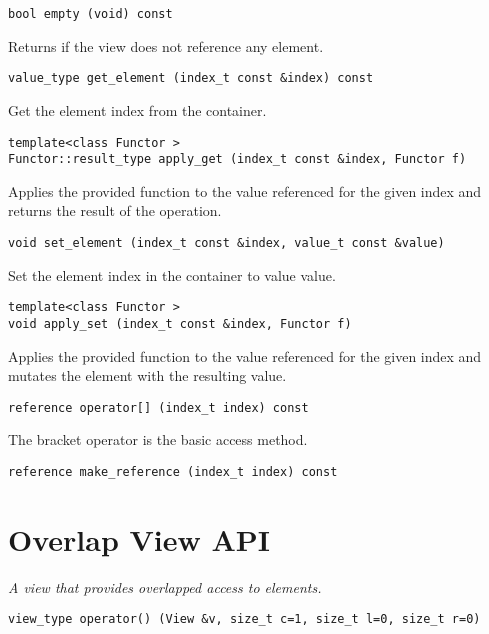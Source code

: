 \begin{verbatim}
bool empty (void) const
\end{verbatim}

Returns if the view does not reference any element.

\begin{verbatim}
value_type get_element (index_t const &index) const
\end{verbatim}

Get the element index from the container.

\begin{verbatim}
template<class Functor >
Functor::result_type apply_get (index_t const &index, Functor f)
\end{verbatim}

Applies the provided function to the value referenced for the given index and returns the result of the operation.

\begin{verbatim}
void set_element (index_t const &index, value_t const &value)
\end{verbatim}

Set the element index in the container to value value.

\begin{verbatim}
template<class Functor >
void apply_set (index_t const &index, Functor f)
\end{verbatim}

Applies the provided function to the value referenced for the given index and mutates the element with the resulting value.

\begin{verbatim}
reference operator[] (index_t index) const
\end{verbatim}

The bracket operator is the basic access method.

\begin{verbatim}
reference make_reference (index_t index) const
\end{verbatim}

\pagebreak

\section {Overlap View API } \label{sec-over-vw}

\emph{ A view that provides overlapped access to elements.}

\begin{verbatim}
view_type operator() (View &v, size_t c=1, size_t l=0, size_t r=0)
\end{verbatim}

